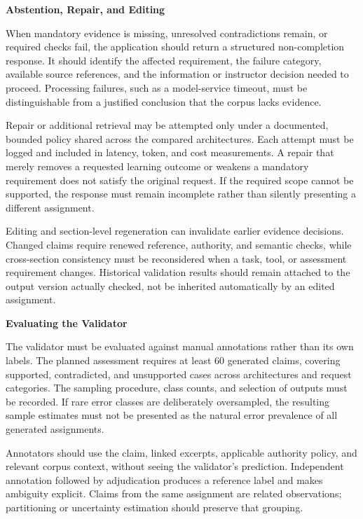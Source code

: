 \documentclass[12pt,a4paper]{report}
\numberwithin{equation}{chapter}
\begin{document}
\par\medskip
\textbf{Abstention, Repair, and Editing}

When mandatory evidence is missing, unresolved contradictions remain, or required checks fail, the application should return a structured non-completion response. It should identify the affected requirement, the failure category, available source references, and the information or instructor decision needed to proceed. Processing failures, such as a model-service timeout, must be distinguishable from a justified conclusion that the corpus lacks evidence.

Repair or additional retrieval may be attempted only under a documented, bounded policy shared across the compared architectures. Each attempt must be logged and included in latency, token, and cost measurements. A repair that merely removes a requested learning outcome or weakens a mandatory requirement does not satisfy the original request. If the required scope cannot be supported, the response must remain incomplete rather than silently presenting a different assignment.

Editing and section-level regeneration can invalidate earlier evidence decisions. Changed claims require renewed reference, authority, and semantic checks, while cross-section consistency must be reconsidered when a task, tool, or assessment requirement changes. Historical validation results should remain attached to the output version actually checked, not be inherited automatically by an edited assignment.

\par\medskip
\textbf{Evaluating the Validator}

The validator must be evaluated against manual annotations rather than its own labels. The planned assessment requires at least 60 generated claims, covering supported, contradicted, and unsupported cases across architectures and request categories. The sampling procedure, class counts, and selection of outputs must be recorded. If rare error classes are deliberately oversampled, the resulting sample estimates must not be presented as the natural error prevalence of all generated assignments.

Annotators should use the claim, linked excerpts, applicable authority policy, and relevant corpus context, without seeing the validator's prediction. Independent annotation followed by adjudication produces a reference label and makes ambiguity explicit. Claims from the same assignment are related observations; partitioning or uncertainty estimation should preserve that grouping.
\end{document}
